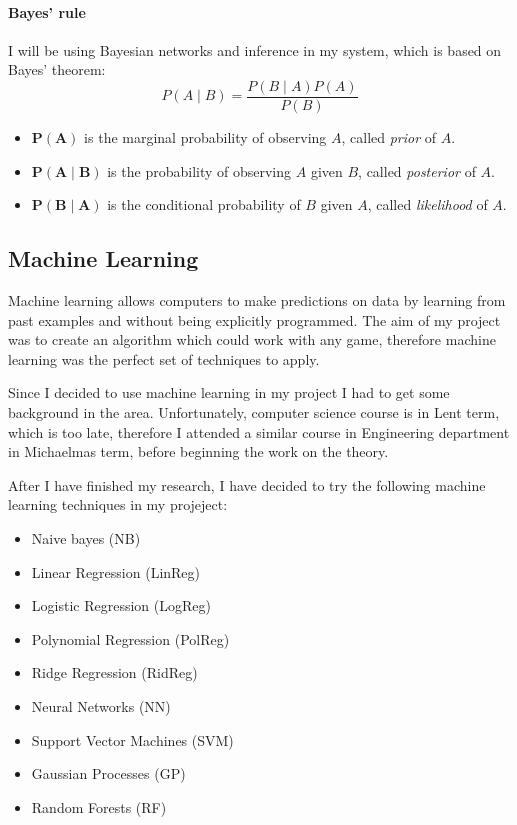 \documentclass[12pt,a4paper]{book}
\begin{document}
\paragraph{Bayes' rule}
I will be using Bayesian networks and inference in my system, which is based on Bayes' theorem:
\begin{equation*}
P(A\mid B) = \frac{P(B\mid A)P(A)}{P(B)}
\end{equation*}
\begin{itemize}
\item $\boldsymbol{P(A)}$ is the marginal probability of observing $A$, called \emph{prior} of $A$.
\item $\boldsymbol{P(A \mid B)}$ is the probability of observing $A$ given $B$, called \emph{posterior} of $A$.
\item $\boldsymbol{P(B \mid A)}$ is the conditional probability of $B$ given $A$, called \emph{likelihood} of $A$.
\end{itemize}
\subsection{Machine Learning}
Machine learning allows computers to make predictions on data by learning from past examples and without being explicitly programmed.
The aim of my project was to create an algorithm which could work with any game, therefore machine learning was the perfect set of techniques to apply.

Since I decided to use machine learning in my project I had to get some background in the area.
Unfortunately, computer science course is in Lent term, which is too late, therefore I attended a similar course in Engineering department in Michaelmas term, before beginning the work on the theory.

After I have finished my research, I have decided to try the following machine learning techniques in my projeject:
\begin{itemize}
\item Naive bayes (NB)
\item Linear Regression (LinReg)
\item Logistic Regression (LogReg)
\item Polynomial Regression (PolReg)
\item Ridge Regression (RidReg)
\item Neural Networks (NN)
\item Support Vector Machines (SVM)
\item Gaussian Processes (GP)
\item Random Forests (RF)
\end{itemize}
\end{document}
